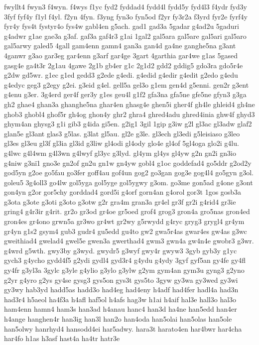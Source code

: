 {fwyllt4
fwyn3
f4wyn.
f4wys
f1yc
fyd2
fyddad4
fydd4l
fydd5y
fyd4l3
f4ydr
fyd3y
3fyf
fyf4y
f1yl
f4yl.
f2yn
4fyn.
f3yng
fyn3o
fyn5od
f2yr
fy3r2a
f3yrd
fyr2e
fyrf4y
fyr4y
fys4t
fystyr4o
fys4w
gabl4en
g5ach.
gad1
gad3a
5gadar
g4ad2u
5gaduri
g4adwr
g1ae
gae3a
g3af.
gaf3a
gaf4r3
g1ai
1gal2
gal5ara
gal5are
gal5ari
gal5aro
gal5arwy
galed5
4gall
gam4enn
gamn4
gan3a
gan4d
ga4ne
ganghe5na
g3ant
4ganwr
g3ao
gar3eg
gar4enn
g3arf
gar4ge
3gart
4garthia
gar4we
g1as
5gased
gasg4e
ga4t3r
2g1au
4gawe
2g1b
gb4er
g1c
2g1d2
gdd2
gddig5
gdo3ra
gdo5r4e
g2dw
gd5wr.
g1ec
g1ed
gedd3
g2ede
g4edi.
g4edid
g4edir
g4edit
g2edo
g4edu
g4edyc
geg3
g2egy
g2ei.
g3eid
g4el.
gell5a
gel3o
g1em
gen4d
g5enni.
gen2r
g3ent
g4enu
g3er.
3g4erd
ger4f
ger3y
g1es
geu4l
g1f2
gfa3na
gfa5ne
gfe5ne
gfyn3
g3ga
gh2
ghae4
ghan3a
ghanghe5na
ghar4en
ghasg4e
ghen5i
gher4f
gh4le
ghleid4
gh4ne
ghob3
ghobl4
ghof5r
gh4og
ghon4y
ghr2
ghra4
ghred4adu
ghred4inia
ghw4f
ghyd3
ghym4an
ghysg3
g1i
gib3
g4ida
gi5en.
g2ig1
3gil
1gip
g3iw
g2l
gl3ac
gl3adw
glaf2
glan5e
gl3ant
glas3
g5las.
g3lat
gl5au.
gl2e
g3le.
gl3ech
gl3edi
g5leisiaso
g3leo
gl3es
gl3eu
gl3f
gl3ia
gl3id
g3liw
gl4odi
gl4ody
glo4e
gl4of
5gl4oga
glo2i
g4lu.
g4lwc
g4l4wm
g4l3wn
g4lwyf
gl3yc
g3lyd.
gl4ym
gl4ys
gl4yw
g2n
gn2i
gn3io
g4niw
g3nï1
gno3e
gn2of
gn2u
gn1w
gn4yw
gobl4
g1oc
goddefad4
go5ddr
g2od2y
god5yn
g2oe
go5fau
go3fer
goff4au
gof4un
gog2
go3gan
gog3e
gog4l4
go5gyn
g3ol.
goleu5
3g4oll3
go4lw
gol5yga
gol5yge
gol5ygwy
g3om.
go3me
gon5ad
g4one
g3ont
gon4yn
g2or
gor5chy
gorddad4
gord5i
g4orf
gorn4an
g4orol
gor3t
1gos
gosb3a
g3ota
g3ote
g3oti
g3oto
g3otw
g2r
gra4m
gran3a
gr4el
gr3f
gr2i
g4rid4
gr3ie
gring4
g4r3ir
g4rit.
gr2o
gr3od
gr4oe
gr5oed
grof4
grog3
gron4a
gro5nas
gron4ed
gron4es
gr4ono
grwn5a
gr3wo
gr4wt
gr2wy
g5rwydd
g4ryc
gryg3
grygl4
gr4ym
gr4yn
g1s2
gsym4
gub3
gudr4
gu5edd
gu4to
gw2
gwa5r4as
gwar4es
gw4as
g3wc
gweithiad4
gwelad4
gwel5e
gwen3a
gwerthad4
gwm3
gwn4a
gw4n4e
gwobr3
g3wr.
g4wrd
g5wth.
gwy3by
g3wyd.
gwydr5
g3wyf
gwy4r
gwyw3
3gyb
gyb3y
g1yc
gych3
g4ycho
gydd4f5
g2ydi
gydl4
gyd3r4
g4ydu
g4ydy
3gyf
gyf5an
gy4fe
gy4fl
gy4fr
g3yl3a
3gylc
g3yle
g4ylio
g3ylo
g3ylw
g2ym
gym4an
gym3u
gyng3
g2yno
g2yr
g4yro
g2ys
gy4se
gysg3
gys5on
gys3t
gys5to
3gyw
gy3wa
gy3wed
gy3wi
gy3wy
hab3yd
hadd5as
hadd3o
had4eg
had4eny
h4adf
had4fer
hadl4a
had3n
had3r4
h5aeol
ha4f3a
h4afl
haf5ol
h4afs
hag3w
h1ai
h4aif
hal3e
hall3o
hal3o
ham4enn
hamn4
ham3s
han3ad
h4anau
hanc4
han3d
ha4ne
han5edd
han4er
h4ange
hanghen4r
han3ig
han3l
han2o
han4oda
han5olai
han5olas
han5ole
han5olwy
hanrhyd4
hansodd4ei
har5adwy.
hara3t
harato4en
har4bwr
har4cha
har4fo
h1as
h3asf
hast4a
ha4tr
hatr3e
}
